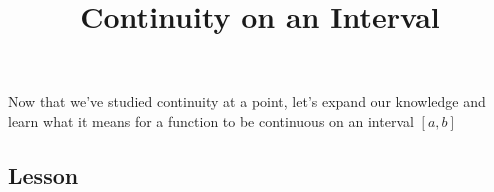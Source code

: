 \documentclass{ximera}
\title{Continuity on an Interval}
\begin{document}
\begin{abstract}
\end{abstract}

\maketitle

Now that we've studied continuity at a point, let's expand our knowledge and learn what it means for a function to be continuous on an interval $[a,b]$

\subsection{Lesson}
\begin{center}
\end{center}
\end{document}
